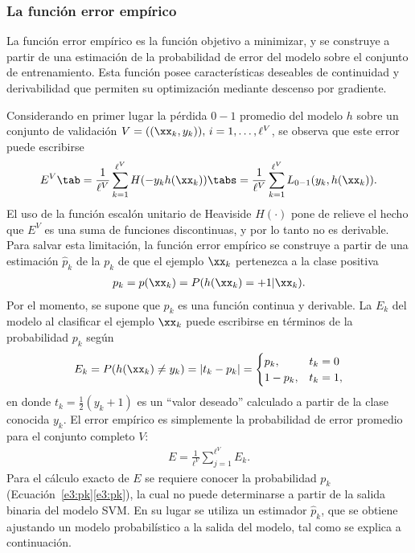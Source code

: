 %
\subsubsection{La función error empírico}
%
La función error empírico es la función objetivo a minimizar, y se
construye a partir de una estimación de la probabilidad de error del
modelo sobre el conjunto de entrenamiento.
Esta función posee características deseables de continuidad y
derivabilidad que permiten su optimización mediante descenso por
gradiente.

Considerando en primer lugar la pérdida $0-1$ promedio del modelo $h$
sobre un conjunto de validación $V=((\xx_k,y_k)),\,i=1,\ldots,\ell^V$,
se observa que este error puede escribirse
%
\begin{align}
\label{e3:error-test-alt}
E^V \tab = \frac{1}{\ell^V}\sum_{k=1}^{\ell^V} H(-{y}_k {h}(\xx_k))
\tabs = \frac{1}{\ell^V}\sum_{k=1}^{\ell^V} L_{0-1}(y_k,h(\xx_k)).
\end{align}
%
El uso de la función escalón unitario de Heaviside $H(\cdot)$ pone de
relieve el hecho que $E^V$ es una suma de funciones discontinuas, y
por lo tanto no es derivable.
Para salvar esta limitación, la función error empírico se construye a
partir de una estimación $\hat{p}_k$ de la  $p_k$ de que el ejemplo $\xx_k$ pertenezca a la clase
positiva
%
\begin{align}
  \label{e3:pk}
  p_k = p(\xx_k) = P(h(\xx_k)=+1|\xx_k).
\end{align}
%
Por el momento, se supone que $p_k$ es una función continua y
derivable.
La  $E_k$ del modelo al clasificar el ejemplo
$\xx_k$ puede escribirse en términos de la probabilidad $p_k$ según
%
\begin{align}
\label{e3:Ek}
  E_k = P(h(\xx_k)\neq y_k) = |t_k-{p}_k| =
  \begin{cases}
    {p}_k, & t_k=0\\ 1-{p}_k, & t_k = 1,
  \end{cases}
\end{align}
%
en donde $t_k=\frac{1}{2}({y_k+1})$ es un ``valor deseado'' calculado
a partir de la clase conocida $y_k$.
El error empírico es simplemente la probabilidad de error promedio
para el conjunto completo $V$:
%
\begin{align}
\label{Err1}
  E = \frac{1}{\ell^V}\sum_{j=1}^{\ell^V} E_k.
\end{align}
%
Para el cálculo exacto de $E$ se requiere conocer la probabilidad
$p_k$ (\iflatexml{}Ecuación~\ref{e3:pk}\else\autoref{e3:pk}\fi), la
cual no puede determinarse a partir de la salida binaria del modelo
SVM.
En su lugar se utiliza un estimador $\hat{p}_k$, que se obtiene
ajustando un modelo probabilístico a la salida del modelo, tal como se
explica a continuación.
